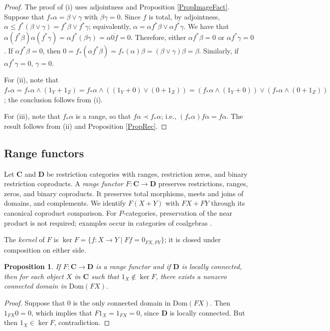 \documentclass[letterpaper,10pt]{amsart}
\theoremstyle{plain}
\newtheorem{prop}{Proposition}[thm]
\theoremstyle{definition}
\newcommand{\rst}[1]{\overline{#1}}
\begin{document}
\begin{proof}
The proof of (i) uses adjointness and Proposition \ref{PropImageFact}.
Suppose that $f_*\alpha=\beta\vee\gamma$ with $\beta\gamma=0$. Since $f$ is total, by
adjointness, $\alpha\le
f^*(\beta\vee\gamma)=f^*\beta\vee f^*\gamma$;
equivalently, $\alpha=\alpha f^*\beta\vee\alpha f^*\gamma$. We
have that
$\alpha(f^*\beta)\alpha(f^*\gamma)=\alpha f^*(\beta\gamma)=\alpha\rst{0f}=0$.
Therefore, either $\alpha f^*\beta=0$ or $\alpha f^*\gamma=0$.
If $\alpha f^*\beta=0$, then
$0=f_*(\alpha f^*\beta)=f_*(\alpha)\beta=(\beta\vee\gamma)\beta=\beta$.
Similarly, if $\alpha f^*\gamma=0$, $\gamma=0$.

For (ii), note that $f_*\alpha=f_*\alpha\wedge(1_Y+
1_Z)=f_*\alpha\wedge((1_Y+ 0)\vee(0+ 1_Z))
=(f_*\alpha\wedge(1_Y+ 0))\vee (f_*\alpha\wedge(0+ 1_Z))$;
the conclusion follows from (i).

For (iii), note that $f_*\alpha$ is a range, so that $f\alpha\prec
f_*\alpha$; i.e., $(f_*\alpha)f\alpha =f\alpha$. The result
follows from (ii) and Proposition \ref{PropRec}.
\end{proof}

\subsection{Range functors}
Let $\mathbf C$ and $\mathbf D$ be restriction categories with ranges,
restriction zeros, and binary restriction coproducts. A \textit{range
functor} $F:\mathbf C\to\mathbf D$ preserves restrictions, ranges,
zeros, and binary coproducts. It preserves total morphisms, meets and
joins of domains, and complements. We identify $F(X+Y)$ with
$FX+FY$ through its canonical coproduct comparison. For $P$-categories,
preservation of the near product is not required; examples occur in
categories of coalgebras \cite{leng}.

The \textit{kernel} of $F$ is
$\ker F=\{f:X\to Y\mid Ff=0_{FX,FY}\}$; it is closed under
composition on either side.

\begin{prop}\label{PropKernel}
If $F:\mathbf{C}\rightarrow\mathbf{D}$ is a range functor and if $\mathbf{D}$
is locally connected, then for each object $X$ in $\mathbf{C}$ such that $1_X\notin\ker F$, there exists a nonzero connected domain in $\mathrm{Dom}(FX)$.
\end{prop}

\begin{proof}
Suppose that $0$ is the only connected domain in $\mathrm{Dom}(FX)$. Then $1_{F X}0 = 0$, which implies that $F1_X = 1_{F X} = 0$, since $\mathbf{D}$ is locally connected. But then
$1_X\in\ker F$, contradiction.  
\end{proof}
\end{document}
